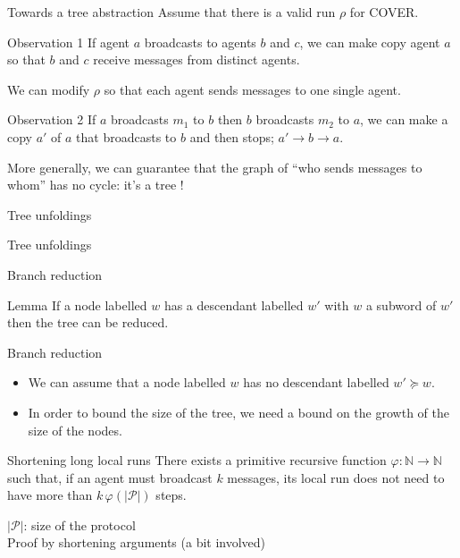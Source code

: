 \documentclass{beamer}
\begin{document}
\begin{frame}
	\tableofcontents[currentsubsection]
\end{frame}

\begin{frame}{Towards a tree abstraction}
Assume that there is a valid run $\rho$ for COVER. 
\begin{block}{Observation 1}
If agent $a$ broadcasts to agents $b$ and $c$, we can make copy agent $a$ so that $b$ and $c$ receive messages from distinct agents. 
\end{block}
We can modify $\rho$ so that each agent sends messages to one single agent.
\pause

\begin{block}{Observation 2}
If $a$ broadcasts $m_1$ to $b$ then $b$ broadcasts $m_2$ to $a$, we can make a copy $a'$ of $a$ that broadcasts to $b$ and then stops; $a' \to b \to a$.
\end{block}
More generally, we can guarantee that the graph of ``who sends messages to whom'' has no cycle: it's a tree !
\end{frame}
	

\begin{frame}{Tree unfoldings}
	

	
	
\end{frame}

\begin{frame}{Tree unfoldings}
	
	
\end{frame}

\begin{frame}{Branch reduction}
	
	\begin{block}{Lemma}
		If a node labelled $w$ has a descendant labelled $w'$ with $w$ a subword of $w'$ then the tree can be reduced.
	\end{block}
	
	
\end{frame}

\begin{frame}{Branch reduction}
	\begin{itemize}
		\item We can assume that a node labelled $w$ has no descendant labelled $w' \succeq w$.
		\pause 
		\item In order to bound the size of the tree, we need a bound on the growth of the size of the nodes.
	\end{itemize}

	\pause

	\begin{block}{Shortening long local runs} There exists a primitive recursive function $\varphi: \mathbb{N} \rightarrow \mathbb{N}$ such that, if an agent must broadcast $k$ messages, its local run does not need to have more than $k \, \varphi(|\mathcal{P}|)$ steps. 
	\end{block}
	$|\mathcal{P}|$: size of the protocol \\
	Proof by shortening arguments (a bit involved)
\end{frame}
\end{document}
